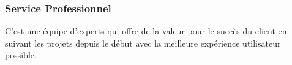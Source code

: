 \subsubsection{Service Professionnel}
C'est une équipe d'experts qui offre de la valeur pour le succès du client en suivant les projets depuis le début avec la meilleure expérience utilisateur possible.
